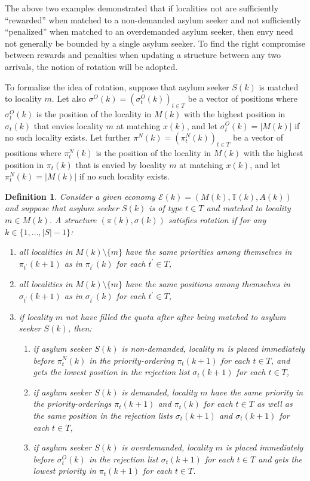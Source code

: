 \documentclass[12pt,fleqn]{article}
\newtheorem{definition}{Definition}
\begin{document}
\noindent The above two examples demonstrated that if localities not are sufficiently ``rewarded'' when matched to a non-demanded asylum seeker and not sufficiently ``penalized'' when matched to an overdemanded asylum seeker, then envy need not generally be bounded by a single asylum seeker. To find the right compromise between rewards and penalties when updating a structure between any two arrivals, the notion of rotation will be adopted.

To formalize the idea of rotation, suppose that asylum seeker $S(k)$ is matched to locality $m$. Let also $\sigma^{O}(k)=(\sigma^O_t(k))_{t\in T}$ be a vector of positions where $\sigma^O_t(k)$ is the position of the locality in $M(k)$ with the highest position in $\sigma_t(k)$ that envies locality $m$ at matching $x(k)$, and let $\sigma^{O}_t(k)=|M(k)|$ if no such locality exists. Let further $\pi^{N}(k)=(\pi^N_t(k))_{t\in T}$ be a vector of positions where $\pi^N_t(k)$ is the position of the locality in $M(k)$ with the highest position in $\pi_t(k)$ that is envied by locality $m$ at matching $x(k)$, and let $\pi^{N}_t(k)=|M(k)|$ if no such locality exists.
\begin{definition}\rm\label{DEF:Rotation}
Consider a given economy $\mathcal{E}(k)=(M(k),\mathbb{T}(k),A(k))$ and suppose that asylum seeker $S(k)$ is of type $t\in T$ and matched to locality $m\in M(k)$. A structure $(\pi(k),\sigma(k))$ satisfies rotation if for any $k\in\{1,\ldots,|S|-1\}$:
\begin{enumerate}
\item[(i)] all localities in $M(k)\setminus \{m\}$ have the same priorities among themselves in $\pi_{t^\prime}(k+1)$ as in $\pi_{t^\prime}(k)$  for each $t^\prime\in T$,

\item[(ii)] all localities in $M(k)\setminus \{m\}$ have the same positions among themselves in $\sigma_{t^\prime}(k+1)$ as in $\sigma_{t^\prime}(k)$ for each $t^\prime\in T$,

\item[(iii)] if locality $m$ not have filled the quota after after being matched to asylum seeker $S(k)$, then:
\begin{enumerate}
\item[(a)] if asylum seeker $S(k)$ is non-demanded, locality $m$ is placed immediately before $\pi^{N}_t(k)$ in the priority-ordering $\pi_t(k+1)$ for each $t\in T$, and gets the lowest position in the rejection list $\sigma_t(k+1)$ for each $t\in T$,
\item[(b)] if asylum seeker $S(k)$ is demanded, locality $m$ have the same priority in the priority-orderings $\pi_t(k+1)$ and $\pi_t(k)$ for each $t\in T$ as well as the same position in the rejection lists $\sigma_t(k+1)$ and $\sigma_t(k+1)$ for each $t\in T$,
\item[(c)]  if asylum seeker $S(k)$ is overdemanded, locality $m$ is placed immediately before $\sigma^{O}_t(k)$ in the rejection list $\sigma_t(k+1)$ for each $t\in T$ and gets the lowest priority in $\pi_t(k+1)$ for each $t\in T$.
\end{enumerate}
\end{enumerate}
\end{definition}
\end{document}
